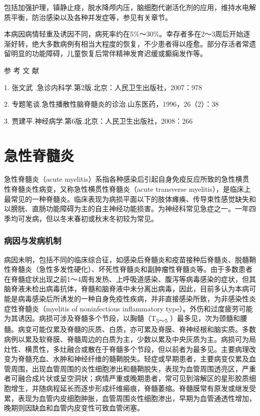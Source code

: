 包括加强护理，镇静止痉，脱水降颅内压，脑细胞代谢活化剂的应用，维持水电解质平衡，防治感染以及各种并发症等，参见有关章节。

本病因病情轻重及诱因不同，病死率约在5\%～30\%。幸存者多在2～3周后开始逐渐好转，绝大多数病例有相当大程度的恢复，不少患者得以痊愈。部分存活者常遗留明显的功能障碍，儿童恢复后常伴精神发育迟缓或癫痫发作等。

\protect\hypertarget{text00257.html}{}{}

\hypertarget{text00257.htmlux5cux23CHP8-6-4}{}
参 考 文 献

1. 张文武 .急诊内科学.第2版.北京：人民卫生出版社，2007：978

2. 专题笔谈.急性播散性脑脊髓炎的诊治.山东医药，1996，26（2）：38

3. 贾建平.神经病学.第6版.北京：人民卫生出版社，2008：266

\protect\hypertarget{text00258.html}{}{}

\chapter{急性脊髓炎}

急性脊髓炎（acute
myelitis）系指各种感染后引起自身免疫反应所致的急性横贯性脊髓炎性病变，又称急性横贯性脊髓炎（acute
transverse
myelitis），是临床上最常见的一种脊髓炎。临床表现为病损平面以下的肢体瘫痪、传导束性感觉缺失和以膀胱、直肠功能障碍为主的自主神经功能损害。为神经科常见急症之一。一年四季均可发病，但以冬末春初或秋末冬初较为常见。

\subsection{病因与发病机制}

病因未明，包括不同的临床综合征，如感染后脊髓炎和疫苗接种后脊髓炎、脱髓鞘性脊髓炎（急性多发性硬化）、坏死性脊髓炎和副肿瘤性脊髓炎等。由于多数患者在脊髓症状出现之前1～4周有发热、上呼吸道感染、腹泻等病毒感染的症状，但其脑脊液未检出病毒抗体，脊髓和脑脊液中未分离出病毒，因此，目前多认为本病可能是病毒感染后所诱发的一种自身免疫性疾病，并非直接感染所致，为非感染性炎症性脊髓炎（myelitis
of noninfectious inflammatory
type）。外伤和过度疲劳可能为其诱因。病损可涉及脊髓多个节段，以胸髓（T\textsubscript{3～5}
）最多见，次为颈髓和腰髓。病变可能仅累及脊髓的灰质、白质，亦可累及脊膜、脊神经根和脑实质。多数病例以累及软脊膜、脊髓周边的白质为主，少数以累及中央灰质为主。病损可为局灶性、横贯性，多灶融合或散在于脊髓多个节段，但以前者为最多见。主要病理改变为脊髓充血、水肿和神经纤维的髓鞘脱失。轻症或早期患者，主要病变仅累及血管周围，出现血管周围的炎性细胞渗出和髓鞘脱失，表现为血管周围透亮区，严重者可融合成片状或呈空洞状；病情严重或晚期患者，常可见到溶解区的星形胶质细胞增生，并随病程延长而逐步形成纤维瘢痕，脊髓萎缩。脊髓膜常有原发或继发受累，表现为血管内皮细胞肿胀，血管周围炎性细胞渗出，早期为血管通透性增加，晚期则因缺血和血管内皮变性可致血管闭塞。

